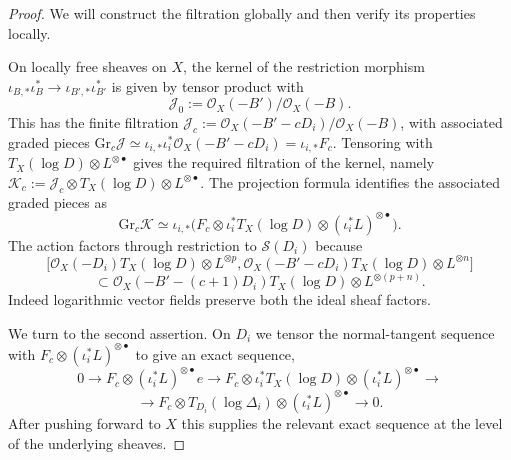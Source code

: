 \documentclass[12pt, oneside]{amsart}       %
\theoremstyle{remark}
\newcommand{\OO}{\mathcal{O}}
\begin{document}
\begin{proof} We will construct the filtration globally and then verify its properties locally.


On locally free sheaves on $X$, the kernel of the restriction morphism $\iota_{B,*}\iota_B^*\to\iota_{B',*}\iota_{B'}^*$ is given by tensor product with $$\mathcal{J}_0:=\OO_X(-B')/\OO_X(-B).$$ This has the finite filtration $\mathcal{J}_c:=\OO_X(-B'-cD_i)/\OO_X(-B)$, with associated graded pieces $\mathrm{Gr}_c\mathcal{J}\simeq\iota_{i,*}\iota_i^*\OO_X(-B'-cD_i)=\iota_{i,*}F_c$. Tensoring with $T_X(\log D)\otimes L^{\otimes\bullet}$ gives the required filtration of the kernel, namely $\mathcal{K}_c:=\mathcal{J}_c\otimes T_X(\log D)\otimes L^{\otimes\bullet}$. The projection formula identifies the associated graded pieces as
$$\mathrm{Gr}_c\mathcal{K}\simeq\iota_{i,*}\big(F_c\otimes\iota_i^*T_X(\log D)\otimes(\iota_i^*L)^{\otimes\bullet}\big).$$
The action factors through restriction to $\mathcal{S}(D_i)$ because
$$\big[\OO_X(-D_i)T_X(\log D)\otimes L^{\otimes p},\OO_X(-B'-cD_i)T_X(\log D)\otimes L^{\otimes n}\big]$$
$$\subset\OO_X(-B'-(c+1)D_i)T_X(\log D)\otimes L^{\otimes(p+n)}.$$
Indeed logarithmic vector fields preserve both the ideal sheaf factors.

We turn to the second assertion. On $D_i$ we tensor the normal-tangent sequence with $F_c\otimes(\iota_i^*L)^{\otimes\bullet}$ to give an exact sequence,
$$0\to F_c\otimes(\iota_i^*L)^{\otimes\bullet}e\to F_c\otimes\iota_i^*T_X(\log D)\otimes(\iota_i^*L)^{\otimes\bullet}\to$$ $$\to F_c\otimes T_{D_i}(\log\Delta_i)\otimes(\iota_i^*L)^{\otimes\bullet}\to 0.$$ After pushing forward to $X$ this supplies the relevant exact sequence at the level of the underlying sheaves. 


\end{proof}
\end{document}

